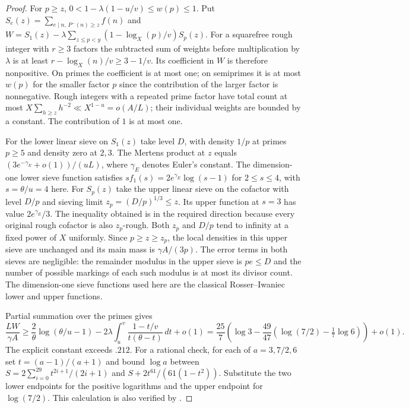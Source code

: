\documentclass[11pt,a4paper]{article}
\theoremstyle{paperplain}
\numberwithin{equation}{section}
\begin{document}
\begin{proof}
For $p\ge z$, $0<1-\lambda(1-u/v)\le w(p)\le1$.
Put $S_e(z)=\sum_{e\mid n,\,P^-(n)\ge z} f(n)$
and $W=S_1(z)-\lambda\sum_{z\le p<y}(1-\log_X(p)/v)S_p(z)$.
For a squarefree rough integer with $r\ge3$ factors the subtracted
sum of weights before multiplication by $\lambda$ is at least
$r-\log_X(n)/v\ge3-1/v$. Its coefficient in $W$ is therefore
nonpositive. On primes the coefficient is at most one; on semiprimes
it is at most $w(p)$ for the smaller factor $p$ since the contribution of the
larger factor is nonnegative. Rough integers with a repeated prime
factor have total count at most
$X\sum_{h\ge z}h^{-2}\ll X^{1-u}=o(A/L)$; their individual weights
are bounded by a constant. The contribution of $1$ is at most one.

For the lower linear sieve on $S_1(z)$ take level $D$, with
density $1/p$ at primes $p\ge5$ and density zero at $2,3$. The
Mertens product at $z$ equals $(3e^{-\gamma_E}+o(1))/(uL)$,
where $\gamma_E$ denotes Euler's constant. The dimension-one lower
sieve function satisfies $s f_1(s)=2e^{\gamma_E}\log(s-1)$ for
$2\le s\le4$, with $s=\theta/u=4$ here. For
$S_p(z)$ take the upper linear sieve on the cofactor with level
$D/p$ and sieving limit $z_p=(D/p)^{1/3}\le z$. Its upper function
at $s=3$ has value $2e^{\gamma_E}/3$. The inequality obtained is
in the required direction because every original rough cofactor is
also $z_p$-rough. Both $z_p$ and $D/p$ tend to infinity at a fixed
power of $X$ uniformly. Since $p\ge z\ge z_p$, the local densities
in this upper sieve are unchanged and its main mass is
$\gamma A/(3p)$. The error terms in both sieves are negligible:
the remainder modulus in the upper sieve is $pe\le D$ and the
number of possible markings of each such modulus is at most its
divisor count. The dimension-one sieve functions used here are the
classical Rosser--Iwaniec lower and upper functions.

Partial summation over the primes gives
\[
 \frac{LW}{\gamma A}\ge \frac2\theta\log(\theta/u-1)
 -2\lambda\int_u^v\frac{1-t/v}{t(\theta-t)}\,dt+o(1)
 =\frac{25}{7}
 \left(\log3-\frac{49}{47}
    \left(\log(7/2)-\tfrac17\log6\right)\right)+o(1).
\]
The explicit constant exceeds $.212$. For a rational check, for
each of $a=3,7/2,6$ set $t=(a-1)/(a+1)$ and bound $\log a$ between
$S=2\sum_{i=0}^{29}t^{2i+1}/(2i+1)$ and
$S+2t^{61}/(61(1-t^2))$. Substitute the two lower endpoints for
the positive logarithms and the upper endpoint for $\log(7/2)$.
This calculation is also verified by .
\end{proof}
\end{document}

